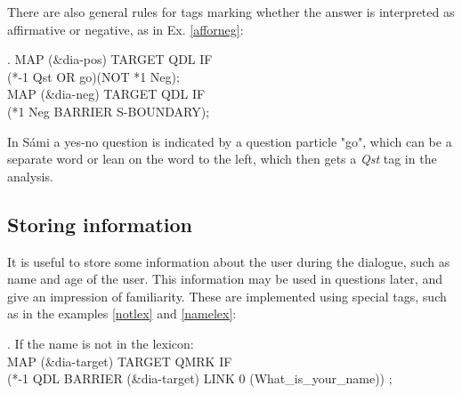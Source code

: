 \documentclass[11pt]{article}
\begin{document}
There are also general rules for tags marking whether the answer is interpreted as affirmative or negative, as in Ex. \ref{afforneg}:

\ex.\flushleft\label{afforneg} \small{MAP (\&dia-pos) TARGET QDL IF \\ (*-1 Qst OR go)(NOT *1 Neg); \\
MAP (\&dia-neg) TARGET QDL IF \\(*1 Neg BARRIER S-BOUNDARY);} 

In Sámi a yes-no question is indicated by a question particle "go", which can be a separate word or lean on the word to the left, which then gets a \textit{Qst} tag in the analysis.
 
 


\subsection{Storing information}
It is useful to store some information about the user during the dialogue, such as name and age of the user. This information may be used in questions later, and give an impression of familiarity. These are implemented using special tags, such as in the examples \ref{notlex} and \ref{namelex}: 

\ex.\flushleft\label{notlex} \small{If the name is not in the lexicon: \\
MAP (\&dia-target) TARGET QMRK IF \\(*-1 QDL BARRIER (\&dia-target) LINK 0 (What\_is\_your\_name)) ;}
\end{document}

